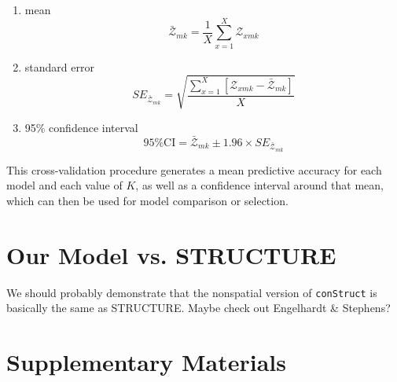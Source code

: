 \documentclass[12pt]{article}
\begin{document}
\begin{enumerate}
\begin{enumerate}
	\item mean
		\begin{equation}
			\bar{\mathcal{Z}}_{mk} = \frac{1}{X}\sum\limits_{x=1}^{X}\mathcal{Z}_{xmk}
		\end{equation}
	\item standard error
		\begin{equation}
			SE_{\bar{\mathcal{Z}}_{mk}} = \sqrt{\frac{\sum\limits_{x=1}^{X} \left[ {\mathcal{Z}_{xmk} - \bar{\mathcal{Z}}_{mk}} \right]}{X}}
		\end{equation}
	\item 95\% confidence interval
		\begin{equation}
			95\% \text{CI} = \bar{\mathcal{Z}}_{mk} \pm 1.96 \times SE_{\bar{\mathcal{Z}}_{mk}}
		\end{equation}
	\end{enumerate}
\end{enumerate}

This cross-validation procedure generates a mean predictive accuracy for each model and each value of $K$, 
as well as a confidence interval around that mean,
which can then be used for model comparison or selection.

\section{Our Model vs. STRUCTURE}
We should probably demonstrate that the nonspatial version of \texttt{conStruct} is basically the same as STRUCTURE.
Maybe check out Engelhardt \& Stephens?

\newpage
\section*{Supplementary Materials}
\renewcommand{\theequation}{S\arabic{equation}}
\setcounter{equation}{0}
\renewcommand{\thetable}{S\arabic{table}}
\setcounter{table}{0}
\renewcommand{\thefigure}{S\arabic{figure}}
\setcounter{figure}{0}
\end{document}
